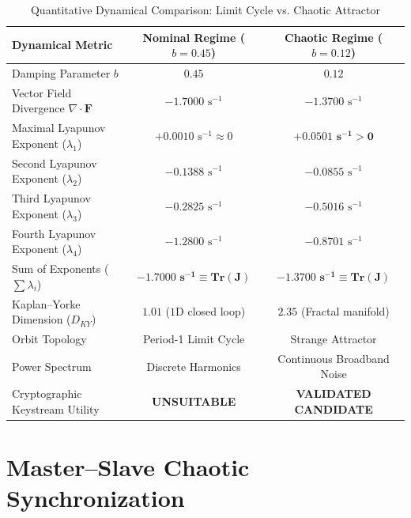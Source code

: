 \documentclass[12pt,a4paper,oneside]{report}
\begin{document}
\begin{table}[htbp]
\centering
\caption{Quantitative Dynamical Comparison: Limit Cycle vs. Chaotic Attractor}
\label{tab:regime_comp}
\begin{tabularx}{\textwidth}{@{} L{6.0cm} C C @{}}
\toprule
\textbf{Dynamical Metric} & \textbf{Nominal Regime ($b=0.45$)} & \textbf{Chaotic Regime ($b=0.12$)} \\
\midrule
Damping Parameter $b$ & $0.45$ & $0.12$ \\
Vector Field Divergence $\nabla \cdot \mathbf{F}$ & $-1.7000\text{ s}^{-1}$ & $-1.3700\text{ s}^{-1}$ \\
Maximal Lyapunov Exponent ($\lambda_1$) & $+0.0010\text{ s}^{-1} \approx 0$ & $\mathbf{+0.0501\text{ s}^{-1} > 0}$ \\
Second Lyapunov Exponent ($\lambda_2$) & $-0.1388\text{ s}^{-1}$ & $-0.0855\text{ s}^{-1}$ \\
Third Lyapunov Exponent ($\lambda_3$) & $-0.2825\text{ s}^{-1}$ & $-0.5016\text{ s}^{-1}$ \\
Fourth Lyapunov Exponent ($\lambda_4$) & $-1.2800\text{ s}^{-1}$ & $-0.8701\text{ s}^{-1}$ \\
Sum of Exponents ($\sum \lambda_i$) & $\mathbf{-1.7000\text{ s}^{-1} \equiv \text{Tr}(J)}$ & $\mathbf{-1.3700\text{ s}^{-1} \equiv \text{Tr}(J)}$ \\
Kaplan--Yorke Dimension ($D_{KY}$) & $\mathbf{1.01}$ ($1\text{D}$ closed loop) & $\mathbf{2.35}$ (Fractal manifold) \\
Orbit Topology & Period-1 Limit Cycle & Strange Attractor \\
Power Spectrum & Discrete Harmonics & Continuous Broadband Noise \\
Cryptographic Keystream Utility & \textbf{UNSUITABLE} & \textbf{VALIDATED CANDIDATE} \\
\bottomrule
\end{tabularx}
\end{table}

\chapter{Master--Slave Chaotic Synchronization}
\end{document}
